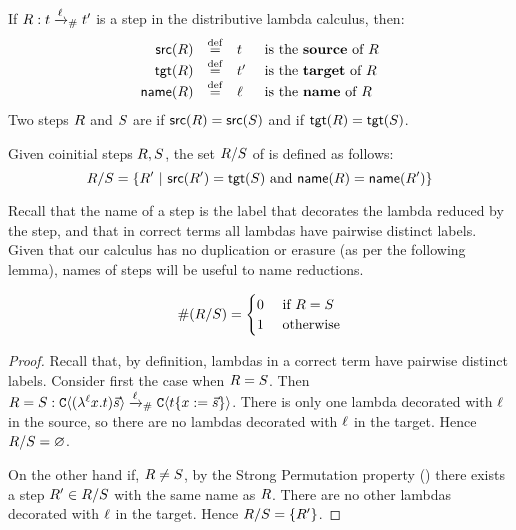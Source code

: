 \begin{definition}
If $R : t \mathrel{\xrightarrow{\ell}_{\mathtt{\#}}} t'$ is a step in the distributive lambda
calculus, then:
\[
  \begin{array}{rcll}
    \mathsf{src}(R) & \overset{\mathrm{def}}{=} & t & \text{ is the {\bf source} of $R$} \\
    \mathsf{tgt}(R) & \overset{\mathrm{def}}{=} & t' & \text{ is the {\bf target} of $R$} \\
    \mathsf{name}(R) & \overset{\mathrm{def}}{=} & \ell & \text{ is the {\bf name} of $R$}
  \end{array}
\]
Two steps $R$ and $S$
are  if $\mathsf{src}(R) = \mathsf{src}(S)$
and  if $\mathsf{tgt}(R) = \mathsf{tgt}(S)$.
\end{definition}

\begin{definition}
Given coinitial steps $R, S$,
the set $R/S$ of  is defined as follows:
\[
  R/S = \{R' \ |\  \mathsf{src}(R') = \mathsf{tgt}(S) \text{ and } \mathsf{name}(R) = \mathsf{name}(R')\}
\]
\end{definition}

\begin{remark}
Recall that the name of a step is the label that decorates the lambda reduced by the step,
and that in correct terms all lambdas have pairwise distinct labels.
Given that our calculus has no duplication or erasure (as per the following lemma),
names of steps will be useful to name reductions.
\end{remark}


\begin{lemma}
\[
  \#(R/S) = \begin{cases}
                         0 & \text{ if $R = S$} \\
                         1 & \text{ otherwise}
                         \end{cases}
\]
\end{lemma}
\begin{proof}
Recall that, by definition, lambdas in a correct term have pairwise distinct labels.
Consider first the case when $R = S$.
Then
$
  R = S : \mathtt{C}\langle(\lambda^{\ell} x. t)\vec{s}\rangle \mathrel{\xrightarrow{\ell}_{\mathtt{\#}}} \mathtt{C}\langle t\{x := \vec{s}\}\rangle
$.
There is only one lambda decorated with $\ell$ in the source,
so there are no lambdas decorated with $\ell$ in the target.
Hence $R/S = \varnothing$.

On the other hand if, $R \neq S$,
by the Strong Permutation property ()
there exists a step $R' \in R/S$
with the same name as $R$.
There are no other lambdas decorated with $\ell$ in the target.
Hence $R/S = \{R'\}$.
\end{proof}


